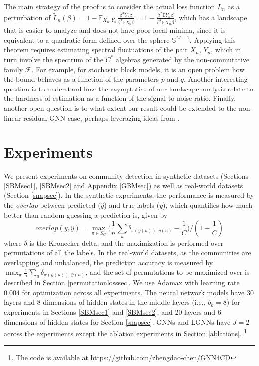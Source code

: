\documentclass{article} \usepackage{iclr2019_conference,times}
\newcommand{\expe}{\mathbb{E}}
\begin{document}
The main strategy of the proof is to consider the actual loss function $L_n$ as a perturbation of $\tilde{L}_n(\beta) = 1-\expe_{X_n, Y_n} \frac{\beta^T Y_n \beta}{\beta^T \expe X_n \beta} = 1-\frac{\beta^T \expe Y_n \beta}{\beta^T \expe X_n \beta}$, which has a landscape that is easier to analyze and does not have poor local minima, since it is equivalent to a quadratic form defined over the sphere $\mathbb{S}^{M-1}$. Applying this theorem requires estimating spectral fluctuations of the pair $X_n$, $Y_n$, which in turn involve the spectrum of the $C^*$ algebras generated by the non-commutative family $\mathcal{F}$. For example, for stochastic block models, it is an open problem how the bound behaves as a function of the parameters $p$ and $q$. 
Another interesting question is to understand how the asymptotics of our landscape analysis relate to the hardness of estimation as a function of the signal-to-noise ratio. Finally, another open question is to what extent our result could be extended to the non-linear residual GNN case, perhaps leveraging ideas from \cite{shamir2018resnets}.





%
 




\section{Experiments}
\label{experimentalsec}

We present experiments on community detection in synthetic datasets (Sections \ref{SBMsec1}, \ref{SBMsec2} and Appendix \ref{GBMsec}) as well as real-world datasets (Section \ref{snapsec}). In 
the synthetic experiments, the performance is measured by the \textit{overlap} between predicted ($\hat{y}$) and true labels ($y$), which quantifies how much better than random guessing a prediction is, given by 
\begin{equation}
    overlap(y, \hat{y}) = \max_{\pi \in S_C} \big(\frac{1}{n}\sum_u \delta_{\pi(y(u)), \hat{y}(u)} - \frac{1}{C}\big)/(1-\frac{1}{C})
\end{equation}
where $\delta$ is the Kronecker delta, and the maximization is performed over permutations of all the labels. In the real-world datasets, as the communities are overlapping and unbalanced, the prediction accuracy is measured by $\max_{\pi} \frac{1}{n}\sum_u \delta_{\pi(y(u)), \hat{y}(u)}$, and the set of permutations to be maximized over is described in Section \ref{permutationlosssec}.
We use Adamax \citep{adam} with learning rate $0.004$ for optimization across all experiments. The neural network models have 30 layers and 8 dimensions of hidden states in the middle layers (i.e., $b_k = 8$) for experiments in Sections \ref{SBMsec1} and \ref{SBMsec2}, and 20 layers and 6 dimensions of hidden states for Section \ref{snapsec}. GNNs and LGNNs have $J=2$ across the experiments except the ablation experiments in Section \ref{ablations}.  \footnote{The code is available at \url{https://github.com/zhengdao-chen/GNN4CD}}
\end{document}
